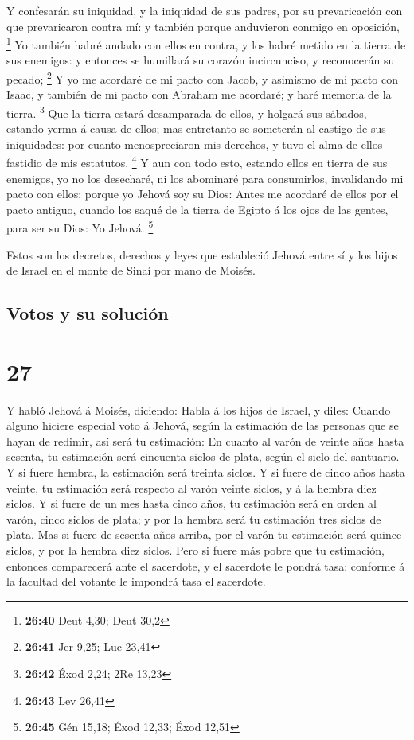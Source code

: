  Y confesarán su iniquidad, y la iniquidad de sus padres,
por su prevaricación con que prevaricaron contra mí: y también porque
anduvieron conmigo en oposición, \footnote{\textbf{26:40} Deut 4,30;
  Deut 30,2}  Yo también habré andado con ellos en contra,
y los habré metido en la tierra de sus enemigos: y entonces se humillará
su corazón incircunciso, y reconocerán su pecado; \footnote{\textbf{26:41}
  Jer 9,25; Luc 23,41}  Y yo me acordaré de mi pacto con
Jacob, y asimismo de mi pacto con Isaac, y también de mi pacto con
Abraham me acordaré; y haré memoria de la tierra. \footnote{\textbf{26:42}
  Éxod 2,24; 2Re 13,23}  Que la tierra estará desamparada
de ellos, y holgará sus sábados, estando yerma á causa de ellos; mas
entretanto se someterán al castigo de sus iniquidades: por cuanto
menospreciaron mis derechos, y tuvo el alma de ellos fastidio de mis
estatutos. \footnote{\textbf{26:43} Lev 26,41}  Y aun con
todo esto, estando ellos en tierra de sus enemigos, yo no los desecharé,
ni los abominaré para consumirlos, invalidando mi pacto con ellos:
porque yo Jehová soy su Dios:  Antes me acordaré de ellos
por el pacto antiguo, cuando los saqué de la tierra de Egipto á los ojos
de las gentes, para ser su Dios: Yo Jehová. \footnote{\textbf{26:45} Gén
  15,18; Éxod 12,33; Éxod 12,51}

 Estos son los decretos, derechos y leyes que estableció
Jehová entre sí y los hijos de Israel en el monte de Sinaí por mano de
Moisés.

\hypertarget{votos-y-su-soluciuxf3n}{%
\subsection{Votos y su solución}\label{votos-y-su-soluciuxf3n}}

\hypertarget{section-26}{%
\section{27}\label{section-26}}

 Y habló Jehová á Moisés, diciendo:  Habla á los
hijos de Israel, y diles: Cuando alguno hiciere especial voto á Jehová,
según la estimación de las personas que se hayan de redimir, así será tu
estimación:  En cuanto al varón de veinte años hasta
sesenta, tu estimación será cincuenta siclos de plata, según el siclo
del santuario.  Y si fuere hembra, la estimación será
treinta siclos.  Y si fuere de cinco años hasta veinte, tu
estimación será respecto al varón veinte siclos, y á la hembra diez
siclos.  Y si fuere de un mes hasta cinco años, tu
estimación será en orden al varón, cinco siclos de plata; y por la
hembra será tu estimación tres siclos de plata.  Mas si
fuere de sesenta años arriba, por el varón tu estimación será quince
siclos, y por la hembra diez siclos.  Pero si fuere más
pobre que tu estimación, entonces comparecerá ante el sacerdote, y el
sacerdote le pondrá tasa: conforme á la facultad del votante le impondrá
tasa el sacerdote.

